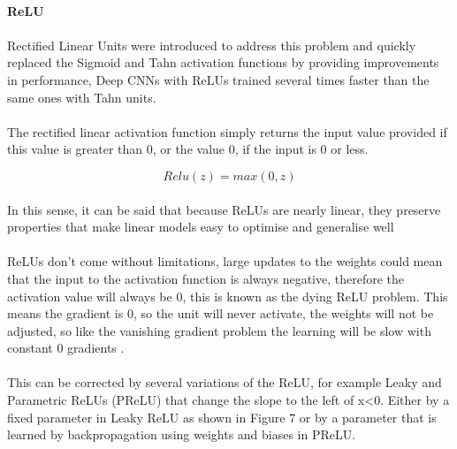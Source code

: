 \documentclass{article}
\begin{document}
\paragraph{ReLU}
\paragraph{}
Rectified Linear Units were introduced to address this problem and quickly replaced the Sigmoid and Tahn activation functions by providing improvements in performance, Deep CNNs with ReLUs trained several times faster than the same ones with Tahn units\cite{GoodBengCour16}.

\paragraph{}
The rectified linear activation function simply returns the input value provided if this value is greater than 0, or the value 0, if the input is 0 or less.

\begin{equation}
    Relu(z) = max(0, z)
\end{equation}

\paragraph{}
In this sense, it can be said that because ReLUs are nearly linear, they preserve properties that make linear models easy to optimise and generalise well \cite{GoodBengCour16}

\paragraph{}
ReLUs don't come without limitations, large updates to the weights could mean that the input to the activation function is always negative, therefore the activation value will always be 0, this is known as the dying ReLU problem.
This means the gradient is 0, so the unit will never activate, the weights will not be adjusted, so like the vanishing gradient problem the learning will be slow with constant 0 gradients \cite{Maas13rectifiernonlinearities}.
\paragraph{}
This can be corrected by several variations of the ReLU, for example Leaky and Parametric ReLUs (PReLU) that change the slope to the left of x<0. Either by a fixed parameter in Leaky ReLU as shown in Figure 7 or by a parameter that is learned by backpropagation using weights and biases in PReLU. 
\end{document}
